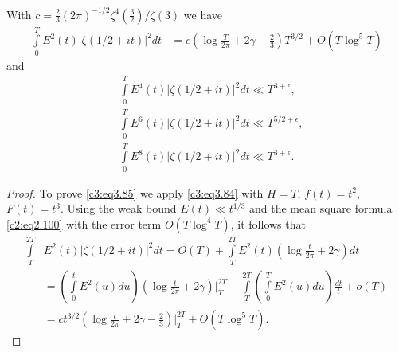 \begin{thm}\label{c3:thm3.6}
  With $c= \frac{2}{3} (2\pi)^{-1/2} \zeta^4 \left(\frac{3}{2} \right)
  /\zeta(3)$ we have
{\fontsize{10pt}{12pt}\selectfont
  \begin{align}
    \int\limits_0^T E^2 (t) |\zeta(1/2 + it)|^2 dt  &= c \left(\log
    \frac{T}{2 \pi} + 2 \gamma - \frac{2}{3}\right) T^{3/2} + O(T \log
    ^5 T)\label{c3:eq3.85}
  \end{align}}
and
\begin{align}
    & \int\limits_0^T E^4 (t) |\zeta (1/2 + it)|^2 dt  \ll
    T^{3+\epsilon},\label{c3:eq3.86} \\
    & \int\limits_0^T E^6 (t) |\zeta (1/2 + it)|^2 dt  \ll
    T^{5/2+\epsilon}\label{c3:eq3.87},\\
    & \int\limits_0^T E^8 (t) |\zeta (1/2 + it)|^2 dt  \ll T^{3 +
      \epsilon}.\label{c3:eq3.88} 
  \end{align}
\end{thm}

\begin{proof}
  To prove \eqref{c3:eq3.85} we apply \eqref{c3:eq3.84} with $H =T$,
  $f(t) = t^2$, $F(t) = t^3$. Using the weak bound $E(t) \ll t^{1/3}$
  and the mean square formula \eqref{c2:eq2.100} with the error term
  $O(T \log^4 T)$, it follows that 
  \begin{align*}
    \int\limits_T^{2T} &E^2 (t) |\zeta (1/2 + it )|^2 dt  = O(T) +
    \int\limits_T^{2T} E^2 (t) \left(\log \frac{t}{2 \pi} + 2 \gamma
    \right) dt\\
    & = \left(\int\limits_0^t E^2 (u) du \right) \left(\log \frac{t}{2
      \pi} + 2 \gamma\right) \Bigg|_T^{2T} - \int\limits_T^{2T}
    \left(\int\limits_0^T E^2 (u) du \right) \frac{dt}{t} + o(T)\\
    & = c t^{3/2} \left(\log \frac{t}{2 \pi} + 2 \gamma - \frac{2}{3}
    \right) \Bigg|_T^{2T} + O(T \log^5 T).
  \end{align*}
\end{proof}

